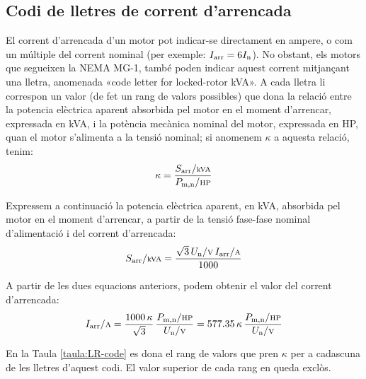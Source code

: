 \subsection{Codi de lletres de corrent d'arrencada}

El corrent d'arrencada d'un motor pot indicar-se directament en ampere, o com un múltiple del corrent nominal (per exemple: $I\ped{arr} = 6 I\ped{n}$). No obstant, els motors que segueixen la NEMA MG-1, també poden indicar aquest corrent mitjançant una lletra, anomenada «code letter for locked-rotor kVA». A cada lletra li correspon un valor (de fet un rang de valors possibles) que dona la relació entre la potencia elèctrica aparent absorbida pel motor en el moment d'arrencar, expressada en kVA, i la potència mecànica nominal del motor, expressada en HP, quan el motor s'alimenta a la tensió nominal; si anomenem $\kappa$ a aquesta relació, tenim:
\begin{equation}
    \kappa = \frac{S\ped{arr}/{\scriptstyle\si{kVA}}}{P\ped{m,n}/{\scriptstyle \si{HP}}}
\end{equation}

Expressem a continuació la potencia elèctrica aparent, en kVA, absorbida pel motor en el moment d'arrencar, a partir de la tensió fase-fase nominal d'alimentació i del corrent d'arrencada:
\begin{equation}
    S\ped{arr}/{\scriptstyle \si{kVA}} = \frac{\sqrt{3}\,U\ped{n}/{\scriptstyle \si{V}}\,I\ped{arr}/{\scriptstyle \si{A}}}{1000}
\end{equation}

A partir de les dues equacions anteriors, podem obtenir el valor del corrent d'arrencada:
\begin{equation}
    I\ped{arr}/{\scriptstyle \si{A}} = \frac{1000 \,\kappa}{\sqrt{3}} \,\frac{P\ped{m,n}/{\scriptstyle \si{HP}}}{U\ped{n}/{\scriptstyle \si{V}}} = \num{577,35}\,\kappa\,\frac{P\ped{m,n}/{\scriptstyle \si{HP}}}{U\ped{n}/{\scriptstyle \si{V}}}\label{eq:LR-code}
\end{equation}

En la Taula \vref{taula:LR-code} es dona el rang de valors que pren $\kappa$ per a cadascuna de les lletres d'aquest codi. El valor superior de cada rang en queda exclòs.

